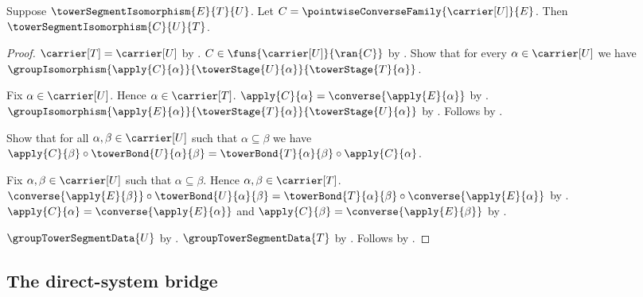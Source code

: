 \begin{theorem}\label{tower_segment_isomorphism_converse}
    Suppose $\towerSegmentIsomorphism{E}{T}{U}$.
    Let $C=\pointwiseConverseFamily{\carrier[U]}{E}$.
    Then $\towerSegmentIsomorphism{C}{U}{T}$.
\end{theorem}
\begin{proof}
    $\carrier[T]=\carrier[U]$ by
        .
    $C\in\funs{\carrier[U]}{\ran{C}}$ by
        .
    Show that for every $\alpha\in\carrier[U]$ we have
        $\groupIsomorphism{\apply{C}{\alpha}}
            {\towerStage{U}{\alpha}}{\towerStage{T}{\alpha}}$.
    \begin{subproof}
        Fix $\alpha\in\carrier[U]$.
        Hence $\alpha\in\carrier[T]$.
        $\apply{C}{\alpha}=\converse{\apply{E}{\alpha}}$ by
            .
        $\groupIsomorphism{\apply{E}{\alpha}}
            {\towerStage{T}{\alpha}}{\towerStage{U}{\alpha}}$ by
            .
        Follows by .
    \end{subproof}
    Show that for all $\alpha,\beta\in\carrier[U]$ such that
        $\alpha\subseteq\beta$ we have
        $\apply{C}{\beta}\circ\towerBond{U}{\alpha}{\beta}=
            \towerBond{T}{\alpha}{\beta}\circ\apply{C}{\alpha}$.
    \begin{subproof}
        Fix $\alpha,\beta\in\carrier[U]$ such that $\alpha\subseteq\beta$.
        Hence $\alpha,\beta\in\carrier[T]$.
        $\converse{\apply{E}{\beta}}\circ
                \towerBond{U}{\alpha}{\beta}=
            \towerBond{T}{\alpha}{\beta}\circ
                \converse{\apply{E}{\alpha}}$ by
            .
        $\apply{C}{\alpha}=\converse{\apply{E}{\alpha}}$ and
            $\apply{C}{\beta}=\converse{\apply{E}{\beta}}$ by
            .
    \end{subproof}
    $\groupTowerSegmentData{U}$ by
        .
    $\groupTowerSegmentData{T}$ by
        .
    Follows by .
\end{proof}

\subsection{The direct-system bridge}

